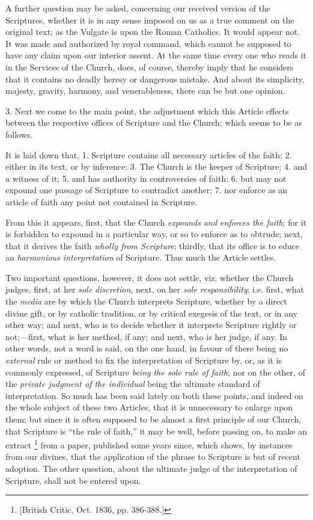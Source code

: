 A further question may be asked, concerning our received version of
the Scriptures, whether it is in any sense imposed on us as a true
comment on the original text; as the Vulgate is upon the Roman
Catholics. It would appear not. It was made and authorized by royal
command, which cannot be supposed to have any claim upon our interior
assent. At the same time every one who reads it in the Services of the
Church, does, of course, thereby imply that he considers that it
contains no deadly heresy or dangerous mistake. And about its
simplicity, majesty, gravity, harmony, and venerableness, there can be
but one opinion.

3. Next we come to the main point, the adjustment which this
Article effects between the respective offices of Scripture and the
Church; which seems to be as follows.

It is laid down that, 1. Scripture contains all necessary articles
of the faith; 2. either in its text, or by inference; 3. The Church is
the keeper of Scripture; 4. and a witness of it; 5. and has authority
in controversies of faith; 6. but may not expound one passage of
Scripture to contradict another; 7. nor enforce as an article of faith
any point not contained in Scripture.

From this it appears, first, that the Church \emph{expounds and
enforces the faith}; for it is forbidden to expound in a particular
way, or so to enforce as to obtrude; next, that it derives the faith \emph{wholly
from Scripture}; thirdly, that its office is to educe an \emph{harmonious
interpretation} of Scripture. Thus much the Article settles.

Two important questions, however, it does not settle, viz. whether
the Church judges, first, at her \emph{sole discretion}, next, on her \emph{sole
responsibility}; i.e. first, what the \emph{media} are by which the
Church interprets Scripture, whether by a direct divine gift, or by
catholic tradition, or by critical exegesis of the text, or in any
other way; and next, who is to decide whether it interprets Scripture
rightly or not;—first, what is her method, if any; and next, who is
her judge, if any. In other words, not a word is said, on the one
hand, in favour of there being no \emph{external} rule or method to
fix the interpretation of Scripture by, or, as it is commonly
expressed, of Scripture \emph{being the sole rule of faith}; nor on
the other, of the \emph{private judgment of the individual} being the
ultimate standard of interpretation. So much has been said lately on
both these points, and indeed on the whole subject of these two
Articles, that it is unnecessary to enlarge upon them; but since it is
often supposed to be almost a first principle of our Church, that
Scripture is ``the rule of faith,'' it may be well, before
passing on, to make an extract \footnote{[British Critic, Oct. 1836, pp. 386-388.]}
from a paper, published some years since, which shows, by instances
from our divines, that the application of the phrase to Scripture is
but of recent adoption. The other question, about the ultimate judge
of the interpretation of Scripture, shall not be entered upon.


